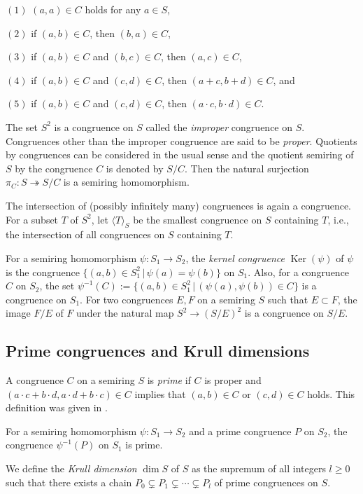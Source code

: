 \documentclass[a4paper,12pt]{amsart}
\theoremstyle{plain}
\theoremstyle{definition}
\begin{document}
$(1)$ $(a, a) \in C$ holds for any $a \in S$,

$(2)$ if $(a, b) \in C$, then $(b, a) \in C$,

$(3)$ if $(a, b) \in C$ and $(b, c) \in C$, then $(a, c) \in C$,

$(4)$ if $(a, b) \in C$ and $(c, d) \in C$, then $(a + c, b + d) \in C$, and

$(5)$ if $(a, b) \in C$ and $(c, d) \in C$, then $(a \cdot c, b \cdot d) \in C$.

The set $S^2$ is a congruence on $S$ called the \textit{improper} congruence on $S$.
Congruences other than the improper congruence are said to be \textit{proper}.
Quotients by congruences can be considered in the usual sense and the quotient semiring of $S$ by the congruence $C$ is denoted by $S / C$.
Then the natural surjection $\pi_C : S \twoheadrightarrow S / C$ is a semiring homomorphism.

The intersection of (possibly infinitely many) congruences is again a congruence.
For a subset $T$ of $S^2$, let $\langle T \rangle_S$ be the smallest congruence on $S$ containing $T$, i.e., the intersection of all congruences on $S$ containing $T$.

For a semiring homomorphism $\psi : S_1 \to S_2$, the \textit{kernel congruence} $\operatorname{Ker}(\psi)$ of $\psi$ is the congruence $\{ (a, b) \in S_1^2 \,|\, \psi(a) = \psi(b) \}$ on $S_1$.
Also, for a congruence $C$ on $S_2$, the set $\psi^{-1}(C) := \{ (a, b) \in S_1^2 \,|\, (\psi(a), \psi(b)) \in C \}$ is a congruence on $S_1$.
For two congruences $E, F$ on a semiring $S$ such that $E \subset F$, the image $F/E$ of $F$ under the natural map $S^2\to(S/E)^2$ is a congruence on $S / E$.

\subsection{Prime congruences and Krull dimensions}
	\label{subsection2.3}

A congruence $C$ on a semiring $S$ is \textit{prime} if $C$ is proper and $(a \cdot c + b \cdot d, a \cdot d + b \cdot c) \in C$ implies that $(a, b) \in C$ or $(c, d) \in C$ holds.
This definition was given in \cite{Joo=Mincheva}.

For a semiring homomorphism $\psi : S_1 \to S_2$ and a prime
congruence $P$ on $S_2$, the congruence $\psi^{-1}(P)$ on $S_1$ is prime.

We define the \textit{Krull dimension} $\operatorname{dim}S$ of $S$ as the supremum of all
integers $l \ge 0$ such that there exists a chain $P_0 \subsetneq P_1 \subsetneq \cdots \subsetneq P_l$ of prime congruences on $S$.
\end{document}
